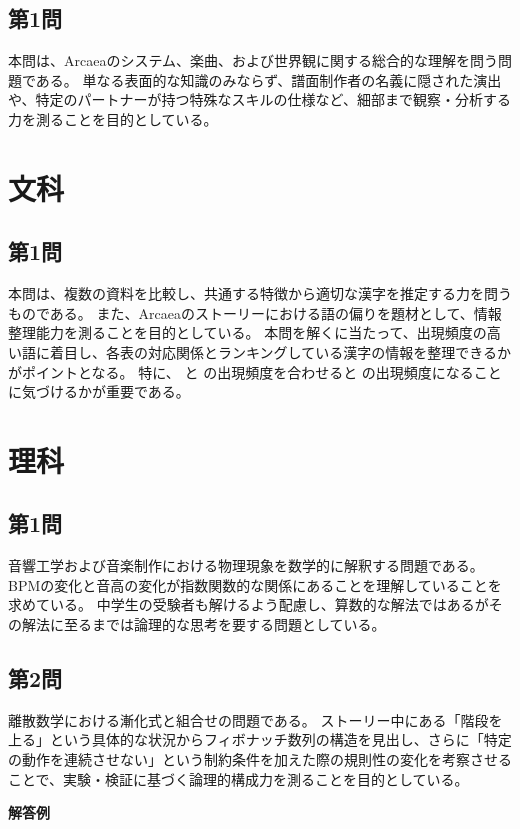\documentclass[uplatex,dvipdfmx,paper=a4paper,fontsize=11pt,jafontscale=0.9247,lang=ja]{jlreq}
\begin{document}
\subsection*{第1問}
本問は、Arcaeaのシステム、楽曲、および世界観に関する総合的な理解を問う問題である。
単なる表面的な知識のみならず、譜面制作者の名義に隠された演出や、特定のパートナーが持つ特殊なスキルの仕様など、細部まで観察・分析する力を測ることを目的としている。

\section*{文科}
\subsection*{第1問}
本問は、複数の資料を比較し、共通する特徴から適切な漢字を推定する力を問うものである。
また、Arcaeaのストーリーにおける語の偏りを題材として、情報整理能力を測ることを目的としている。
本問を解くに当たって、出現頻度の高い語に着目し、各表の対応関係とランキングしている漢字の情報を整理できるかがポイントとなる。
特に、  と  の出現頻度を合わせると  の出現頻度になることに気づけるかが重要である。

\section*{理科}
\subsection*{第1問}
音響工学および音楽制作における物理現象を数学的に解釈する問題である。
BPMの変化と音高の変化が指数関数的な関係にあることを理解していることを求めている。
中学生の受験者も解けるよう配慮し、算数的な解法ではあるがその解法に至るまでは論理的な思考を要する問題としている。

\subsection*{第2問}
離散数学における漸化式と組合せの問題である。
ストーリー中にある「階段を上る」という具体的な状況からフィボナッチ数列の構造を見出し、さらに「特定の動作を連続させない」という制約条件を加えた際の規則性の変化を考察させることで、実験・検証に基づく論理的構成力を測ることを目的としている。

\newpage
\vspace{2em}
\begin{center}
  \LARGE{\textbf{解答例}}
\end{center}
\end{document}
